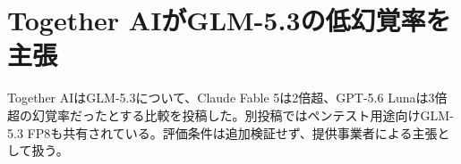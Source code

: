 \section{Together AIがGLM-5.3の低幻覚率を主張}
Together AIはGLM-5.3について、Claude Fable 5は2倍超、GPT-5.6 Lunaは3倍超の幻覚率だったとする比較を投稿した。別投稿ではペンテスト用途向けGLM-5.3 FP8も共有されている。評価条件は追加検証せず、提供事業者による主張として扱う。

